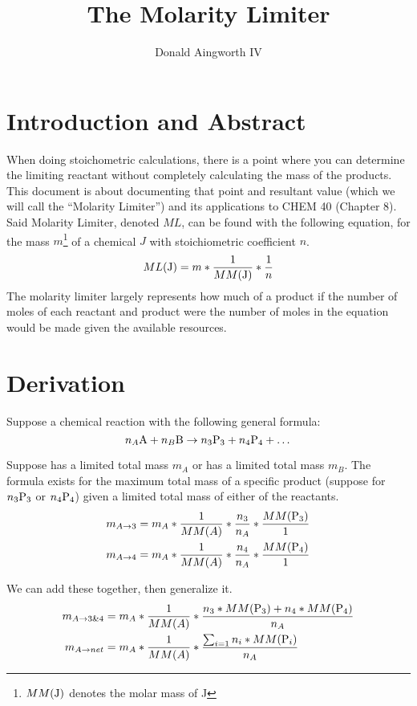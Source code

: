 \documentclass[11pt]{article}
\begin{document}
\title{The Molarity Limiter}
\author{Donald Aingworth IV}
\date{}
\maketitle

\section{Introduction and Abstract}
When doing stoichometric calculations, there is a point where you can determine the limiting reactant without completely calculating the mass of the products.
This document is about documenting that point and resultant value (which we will call the ``Molarity Limiter'') and its applications to CHEM 40 (Chapter 8).
Said Molarity Limiter, denoted $ML$, can be found with the following equation, for the mass $m$\footnote{$MM(\ce{J})$ denotes the molar mass of J} of a chemical $J$ with stoichiometric coefficient $n$.
\begin{equation}
    ML(\ce{J}) = m * \frac{1}{MM(\ce{J})} * \frac{1}{n}
\end{equation}
The molarity limiter largely represents how much of a product if the number of moles of each reactant and product were the number of moles in the equation would be made given the available resources. 

\section{Derivation}
Suppose a chemical reaction with the following general formula:
\begin{equation}
    n_A\ce{A} + n_B\ce{B} \to n_3\ce{P_3} + n_4\ce{P_4} + \dots
\end{equation}

Suppose  has a limited total mass $m_A$ or  has a limited total mass $m_B$. 
The formula exists for the maximum total mass of a specific product (suppose for $n_3\ce{P_3}$ or $n_4\ce{P_4}$) given a limited total mass of either of the reactants.
\begin{align}
    m_{A \to 3} &=  m_A * \frac{1}{MM(A)} * \frac{n_3}{n_A} * \frac{MM(\ce{P_3})}{1}\\
    m_{A \to 4} &=  m_A * \frac{1}{MM(A)} * \frac{n_4}{n_A} * \frac{MM(\ce{P_4})}{1}
\end{align}

We can add these together, then generalize it.
\begin{align}
    m_{A \to 3\&4}  &=  m_A * \frac{1}{MM(A)} * \frac{n_3 * MM(\ce{P_3}) + n_4 * MM(\ce{P_4})}{n_A}\\
    m_{A \to net}   &=  m_A * \frac{1}{MM(A)} * \frac{\sum_{i = 1} n_i * MM(\ce{P_i})}{n_A}
\end{align}
\end{document}
